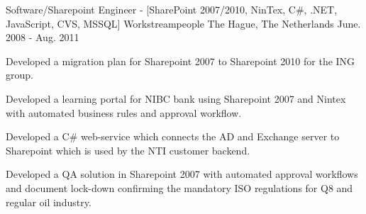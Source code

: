 \begin{cventries}
  \cventry
    {Software/Sharepoint Engineer - [SharePoint 2007/2010, NinTex, C\#, .NET, JavaScript, CVS, MSSQL]} %
    {Workstreampeople} %
    {The Hague, The Netherlands} %
    {June. 2008 - Aug. 2011} %
    {
      \begin{cvitems} %
        \item {Developed a migration plan for Sharepoint 2007 to Sharepoint 2010 for the ING group.}
        \item {Developed a learning portal for NIBC bank using Sharepoint 2007 and Nintex with automated business rules and approval workflow.}
        \item {Developed a C\# web-service which connects the AD and Exchange server to Sharepoint which is used by the NTI customer backend.}
        \item {Developed a QA solution in Sharepoint 2007 with automated approval workflows and document lock-down confirming the mandatory ISO regulations for Q8 and regular oil industry.}
      \end{cvitems}
    }

\end{cventries}
\vspace{20 mm}
